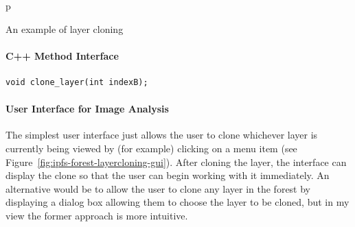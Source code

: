 \begin{stusubfig}{p}
	\\
\caption{An example of layer cloning}
\label{fig:ipfs-forest-layercloning}
\end{stusubfig}

\paragraph{C++ Method Interface}

\begin{lstlisting}[style=Prototype]
void clone_layer(int indexB);
\end{lstlisting}

\paragraph{User Interface for Image Analysis}

The simplest user interface just allows the user to clone whichever layer is currently being viewed by (for example) clicking on a menu item (see Figure~\ref{fig:ipfs-forest-layercloning-gui}). After cloning the layer, the interface can display the clone so that the user can begin working with it immediately. An alternative would be to allow the user to clone any layer in the forest by displaying a dialog box allowing them to choose the layer to be cloned, but in my view the former approach is more intuitive.

